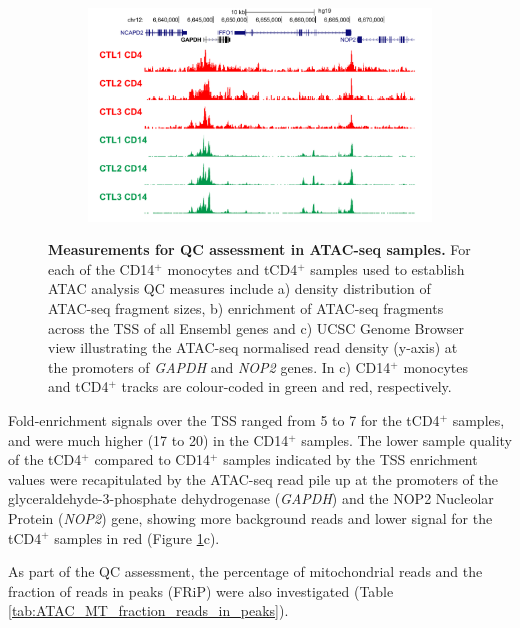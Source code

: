 \begin{figure}[htbp]
\begin{subfigure}[b]{0.6\textwidth}
\centering
\includegraphics[width=\textwidth]{./Results1/pdfs/ATAC_Core_CD4_CD14_fresh_GAPDH}
\caption{\textbf{}} %
\end{subfigure}
\caption[Measurements for QC assessment in ATAC-seq samples]{\textbf{Measurements for QC assessment in ATAC-seq samples.} For each of the CD14$^+$ monocytes and tCD4$^+$ samples used to establish ATAC analysis QC measures include a) density distribution of ATAC-seq fragment sizes, b) enrichment of ATAC-seq fragments across the TSS of all Ensembl genes and c) UCSC Genome Browser view illustrating the ATAC-seq normalised read density (y-axis) at the promoters of \textit{GAPDH} and \textit{NOP2} genes. In c) CD14$^+$ monocytes and tCD4$^+$ tracks are colour-coded in green and red, respectively.}
\label{figure:QC_ATAC}
\end{figure} 


Fold-enrichment signals over the TSS ranged from  5 to 7 for the tCD4$^+$ samples, and were much higher (17 to 20) in the CD14$^+$ samples. The lower sample quality of the tCD4$^+$ compared to CD14$^+$ samples indicated by the TSS enrichment values were recapitulated by the ATAC-seq read pile up at the promoters of the glyceraldehyde-3-phosphate dehydrogenase (\textit{GAPDH}) and the NOP2 Nucleolar Protein (\textit{NOP2}) gene, showing more background reads and lower signal for the tCD4$^+$ samples in red (Figure \ref{figure:QC_ATAC}c).
	
As part of the QC assessment, the percentage of mitochondrial reads and the fraction of reads in peaks (FRiP) were also investigated (Table \ref{tab:ATAC_MT_fraction_reads_in_peaks}). 

